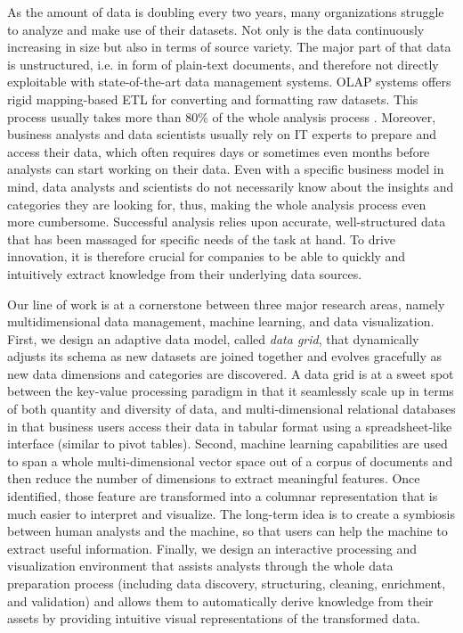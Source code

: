 \documentclass[10pt, a4paper, twocolumn]{article} %
\begin{document}
As the amount of data is doubling every two years, many organizations struggle to analyze and make use of their datasets. Not only is the data continuously increasing in size but also in terms of source variety. The major part of that data is unstructured, i.e. in form of plain-text documents, and therefore not directly exploitable with state-of-the-art data management systems.
OLAP systems offers rigid mapping-based ETL for converting and formatting raw datasets. This process usually takes more than 80\% of the whole analysis process \cite{etl}. Moreover, business analysts and data scientists usually rely on IT experts to prepare and access their data, which often requires days or sometimes even months before analysts can start working on their data. Even with a specific business model in mind, data analysts and scientists do not necessarily know about the insights and categories they are looking for, thus, making the whole analysis process even more cumbersome. 
Successful analysis relies upon accurate, well-structured data that has been massaged for specific needs of the task at hand. 
To drive innovation, it is therefore crucial for companies to be able to quickly and intuitively extract knowledge from their underlying data sources. %

Our line of work is at a cornerstone between three major research areas, namely multidimensional data management, machine learning, and data visualization.  
First, we design an adaptive data model, called \textit{data grid}, that dynamically adjusts its schema as new datasets are joined together and evolves gracefully as new data dimensions and categories are discovered.
A data grid is at a sweet spot between the key-value processing paradigm \cite{map-reduce} in that it seamlessly scale up in terms of both quantity and diversity of data, and multi-dimensional relational databases in that business users access their data in tabular format using a spreadsheet-like interface (similar to pivot tables).
Second, machine learning capabilities are used to span a whole multi-dimensional vector space out of a corpus of documents and then reduce the number of dimensions to extract meaningful features.
Once identified, those feature are transformed into a columnar representation that is much easier to interpret and visualize.  
The long-term idea is to create a symbiosis between human analysts and the machine, so that users can help the machine to extract useful information. 
Finally, we design an interactive processing and visualization environment that assists analysts through the whole data preparation process (including data discovery, structuring, cleaning, enrichment, and validation) and allows them to automatically derive knowledge from their assets by providing intuitive visual representations of the transformed data.
\end{document}
